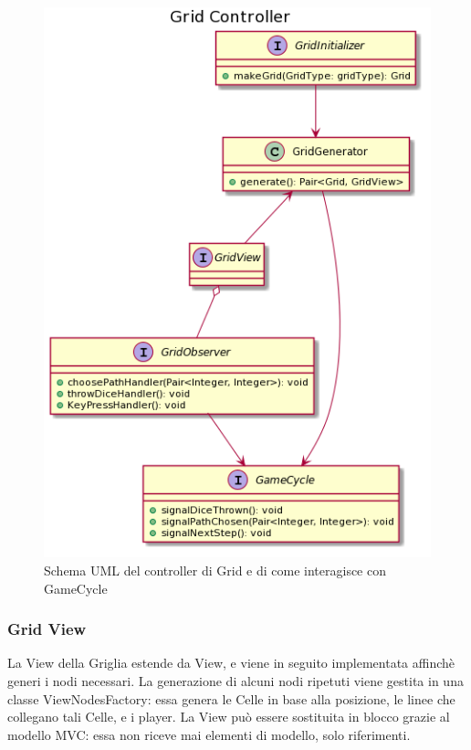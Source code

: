 \documentclass[a4paper,12pt]{report}
\begin{document}
	\begin{figure}[h]
	\centering{}
	\includegraphics[width=\textwidth]{images/ascenzo/grid_controller.png}
	\caption{Schema UML del controller di Grid e di come interagisce con GameCycle}
	\label{img:gridcontroller}
	\end{figure}

    \subsubsection {Grid View}
	La View della Griglia estende da View, e viene in seguito implementata affinchè generi i nodi necessari.
	La generazione di alcuni nodi ripetuti viene gestita in una classe ViewNodesFactory: essa genera le Celle in base alla posizione, le linee che collegano tali Celle, e i player.
	La View può essere sostituita in blocco grazie al modello MVC: essa non riceve mai elementi di modello, solo riferimenti.
\end{document}
